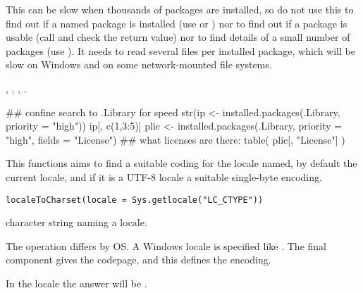 %
\begin{Note}\relax
This can be slow when thousands of packages are installed, so do not
use this to find out if a named package is installed (use
 or ) nor to find
out if a package is usable (call  and check the
return value) nor to find details of a small number of packages (use
).  It needs to read several files per
installed package, which will be slow on Windows and on some
network-mounted file systems.
\end{Note}
%
\begin{SeeAlso}\relax
{},
,
, .
\end{SeeAlso}
%
\begin{Examples}
\begin{ExampleCode}
## confine search to .Library for speed
str(ip <- installed.packages(.Library, priority = "high"))
ip[, c(1,3:5)]
plic <- installed.packages(.Library, priority = "high", fields = "License")
## what licenses are there:
table( plic[, "License"] )
\end{ExampleCode}
\end{Examples}
%
\begin{Description}\relax
This functions aims to find a suitable coding for the locale named, by
default the current locale, and if it is a UTF-8 locale a suitable
single-byte encoding.
\end{Description}
%
\begin{Usage}
\begin{verbatim}
localeToCharset(locale = Sys.getlocale("LC_CTYPE"))
\end{verbatim}
\end{Usage}
%
\begin{Arguments}
\begin{ldescription}
\item[\code{locale}] character string naming a locale.
\end{ldescription}
\end{Arguments}
%
\begin{Details}\relax
The operation differs by OS.
A Windows locale is specified like .
The final component gives the codepage, and this defines the encoding.

In the  locale the answer will be .
\end{Details}
